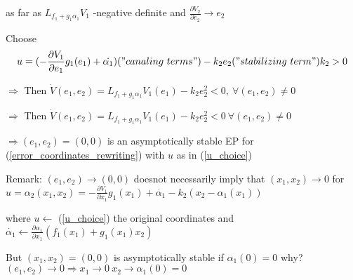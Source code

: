 as far as $L_{f_1 + g_1\alpha_1}V_1$ -negative definite and $\frac{\partial V_2}{\partial e_2} \rightarrow e_2$

Choose 
\begin{equation}\label{u_choice}
u = (- \frac{\partial V_1}{\partial e_1}g_1(e_1) + \dot{\alpha_1})("canaling\ terms") - k_2e_2 ("stabilizing\ term") k_2 > 0
\end{equation}

$\Rightarrow$ Then $\dot{V}(e_1, e_2) = L_{f_1 + g_1\alpha_1}V_1(e_1) - k_2e_2^2 < 0, \ \forall (e_1, e_2) \neq 0$

$\Rightarrow$ Then $\dot V (e_1, e_2) = L_{f_1 + g_1\alpha_1}V_1(e_1) - k_2e_2^2 < 0 \ \forall (e_1, e_2) \neq 0$

$\Rightarrow (e_1, e_2) = (0,0)$ is an asymptotically stable EP for (\ref{error_coordinates_rewriting}) with $u$ as in (\ref{u_choice}) 

Remark: $(e_1, e_2) \to (0,0)$ doesnot necessarily imply that $(x_1, x_2) \to 0$ for $u = \alpha_2(x_1, x_2) = - \frac{\partial V_1}{\partial x_1}g_1(x_1) + \dot{\alpha_1} - k_2(x_2 - \alpha_1(x_1))$

where $u \leftarrow$ (\ref{u_choice}) the original coordinates and $\dot{\alpha_1} \leftarrow \frac{\partial \alpha_1}{\partial x_1}(f_1(x_1) + g_1(x_1)x_2)$

But $(x_1, x_2) = (0,0)$ is asymptotically stable if $\alpha_1(0) = 0$ why? $(e_1,e_2) \to 0 \Rightarrow x_1 \to 0 \ x_2 \to \alpha_1(0) = 0$

